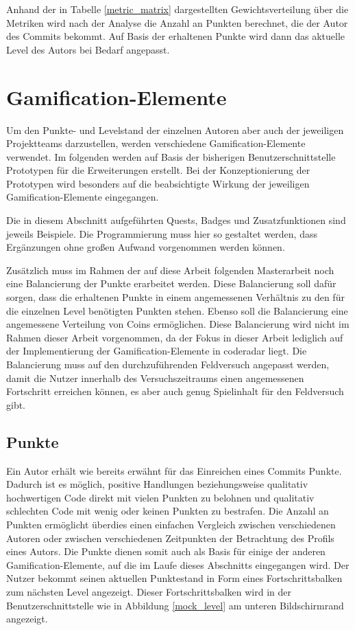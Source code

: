 \documentclass[
	oneside,  %
	ngerman, 
	final, 
	11pt, 
	a4paper, 
	1.1headlines, 
	headinclude=false, 
	footinclude=false, 
	mpinclude=false, 
	pagesize, 
	onecolumn, 
	titlepage, 
	parskip=half, 
	headsepline, 
	chapterprefix=false, 
	version=first, 
	listof=totoc, 
	bibliography=totoc, 
	toc=graduated, 
	fleqn
]{scrbook}
\begin{document}
Anhand der in Tabelle \ref{metric_matrix} dargestellten Gewichtsverteilung über die Metriken wird nach der Analyse die Anzahl an Punkten berechnet, die der Autor des Commits bekommt.
Auf Basis der erhaltenen Punkte wird dann das aktuelle Level des Autors bei Bedarf angepasst.

\section{Gamification-Elemente}
\label{Gamification_Elemente}
Um den Punkte- und Levelstand der einzelnen Autoren aber auch der jeweiligen Projektteams darzustellen, werden verschiedene Gamification-Elemente verwendet.
Im folgenden werden auf Basis der bisherigen Benutzerschnittstelle Prototypen für die Erweiterungen erstellt.
Bei der Konzeptionierung der Prototypen wird besonders auf die beabsichtigte Wirkung der jeweiligen Gamification-Elemente eingegangen.

Die in diesem Abschnitt aufgeführten Quests, Badges und Zusatzfunktionen sind jeweils Beispiele.
Die Programmierung muss hier so gestaltet werden, dass Ergänzungen ohne großen Aufwand vorgenommen werden können.

Zusätzlich muss im Rahmen der auf diese Arbeit folgenden Masterarbeit noch eine Balancierung der Punkte erarbeitet werden.
Diese Balancierung soll dafür sorgen, dass die erhaltenen Punkte in einem angemessenen Verhältnis zu den für die einzelnen Level benötigten Punkten stehen.
Ebenso soll die Balancierung eine angemessene Verteilung von Coins ermöglichen.
Diese Balancierung wird nicht im Rahmen dieser Arbeit vorgenommen, da der Fokus in dieser Arbeit lediglich auf der Implementierung der Gamification-Elemente in coderadar liegt.
Die Balancierung muss auf den durchzuführenden Feldversuch angepasst werden, damit die Nutzer innerhalb des Versuchszeitraums einen angemessenen Fortschritt erreichen können, es aber auch genug \glqq Spielinhalt\grqq{} für den Feldversuch gibt.

\subsection{Punkte}
\label{coderadar_Punkte}
Ein Autor erhält wie bereits erwähnt für das Einreichen eines Commits Punkte.
Dadurch ist es möglich, positive Handlungen beziehungsweise qualitativ hochwertigen Code direkt mit vielen Punkten zu belohnen und qualitativ schlechten Code mit wenig oder keinen Punkten zu bestrafen.
Die Anzahl an Punkten ermöglicht überdies einen einfachen Vergleich zwischen verschiedenen Autoren oder zwischen verschiedenen Zeitpunkten der Betrachtung des Profils eines Autors.
Die Punkte dienen somit auch als Basis für einige der anderen Gamification-Elemente, auf die im Laufe dieses Abschnitts eingegangen wird.
Der Nutzer bekommt seinen aktuellen Punktestand in Form eines Fortschrittsbalken zum nächsten Level angezeigt.
Dieser Fortschrittsbalken wird in der Benutzerschnittstelle wie in Abbildung \ref{mock_level} am unteren Bildschirmrand angezeigt.
\end{document}
